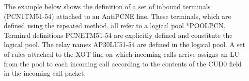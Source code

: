 \documentclass[letterpaper,10pt,english]{sphinxmanual}
\begin{document}
The example below shows the definition of a set of inbound terminals (PCN1TM51-54) attached to an AntiPCNE line. These terminals, which are defined using the repeated method, all refer to a logical pool *POOLPCN. Terminal definitions PCNETM51-54 are explicitly defined and constitute the logical pool. The relay names AP30LU51-54 are defined in the logical pool. A set of rules attached to the XOT line on which incoming calls arrive assigns an LU from the pool to each incoming call according to the contents of the CUD0 field in the incoming call packet.

\begin{sphinxVerbatim}[commandchars=\\\{\}]

\end{sphinxVerbatim}
\end{document}
